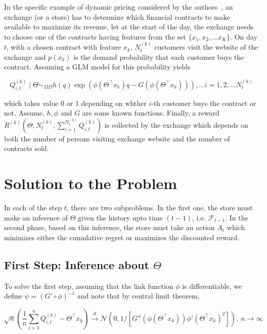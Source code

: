 \documentclass[11pt]{article}
\newcommand{\Fcal}{\mathcal{F}}
\newcommand{\transpose}{^{\intercal}}
\begin{document}
In the specific example of dynamic pricing considered by the authors~\cite{treetanthiploet2021correlated}, an exchange (or a store) has to determine which financial contracts to make available to maximize its revenue, let at the start of the day, the exchange needs to choose one of the contracts having features from the set $\{ x_1, x_2, \dots x_K \}$. On day $t$, with a chosen contract with feature $x_k$, $N_t^{(k)}$ customers visit the website of the exchange and $p(x_k)$ is the demand probability that each customer buys the contract. Assuming a GLM model for this probability yields

$$
Q_{i, t}^{(k)} \mid \Theta \sim_{IID} h(q)\exp\left( \phi(\Theta\transpose x_k )q - G(\phi(\Theta\transpose x_k)) \right), \dots i = 1, 2, \dots N_t^{(k)}
$$

\noindent which takes value $0$ or $1$ depending on whther $i$-th customer buys the contract or not. Assume, $h, \phi$ and $G$ are some known functions. Finally, a reward $R^{(k)}(\Theta, N_t^{(k)}, \sum_{i=1}^{N_t^{(k)}}Q_{i, t}^{(k)})$ is collected by the exchange which depends on both the number of persons visiting exchange website and the number of contracts sold.

\section{Solution to the Problem}

In each of the step $t$, there are two subproblems. In the first one, the store must make an inference of $\Theta$ given the history upto time $(t-1)$, i.e. $\Fcal_{t-1}$. In the second phase, based on this inference, the store must take an action $A_t$ which minimizes either the cumulative regret or maximizes the discounted reward.

\subsection{First Step: Inference about $\Theta$}

To solve the first step, assuming that the link function $\phi$ is differentiable, we define $\psi = (G' \circ \phi)^{-1}$ and note that by central limit theorem,

\begin{equation}
    \sqrt{n}\left( \dfrac{1}{n}\sum_{i=1}^n Q_{i,t}^{(k)} - \Theta\transpose x_k \right) \xrightarrow{d} \mathcal{N}\left( 0, 1/[G''(\phi(\Theta\transpose x_k))\phi'(\Theta\transpose x_k)^2] \right), \ n\rightarrow \infty
    \label{eqn:clt}
\end{equation}
\end{document}
